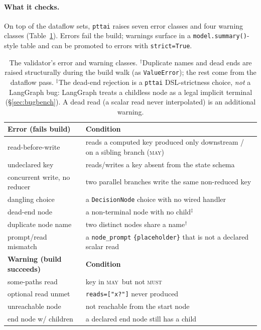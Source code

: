 \documentclass[11pt]{article}
\newcommand{\may}{\textsc{may}}
\newcommand{\must}{\textsc{must}}
\newcommand{\code}[1]{\texttt{#1}}
\begin{document}
\paragraph{What it checks.} On top of the dataflow sets, \code{pttai} raises
seven error classes and four warning classes (Table~\ref{tab:checks}). Errors
fail the build; warnings surface in a \code{model.summary()}-style table and can
be promoted to errors with \code{strict=True}.

\begin{table}[t]
  \centering
  \small
  \begin{tabular}{@{}p{}p{}@{}}
    \toprule
    \textbf{Error (fails build)} & \textbf{Condition} \\
    \midrule
    read-before-write & reads a computed key produced only downstream / on a
    sibling branch (\may) \\
    undeclared key & reads/writes a key absent from the state schema \\
    concurrent write, no reducer & two parallel branches write the same
    non-reduced key \\
    dangling choice & a \code{DecisionNode} choice with no wired handler \\
    dead-end node & a non-terminal node with no child$^\ddagger$ \\
    duplicate node name & two distinct nodes share a name$^\dagger$ \\
    prompt/read mismatch & a \code{node\_prompt} \code{\{placeholder\}} that is
    not a declared scalar read \\
    \midrule
    \textbf{Warning (build succeeds)} & \textbf{Condition} \\
    \midrule
    some-paths read & key in \may\ but not \must \\
    optional read unmet & \code{reads=["x?"]} never produced \\
    unreachable node & not reachable from the start node \\
    end node w/ children & a declared end node still has a child \\
    \bottomrule
  \end{tabular}
  \caption{The validator's error and warning classes. $^\dagger$Duplicate names
  and dead ends are raised structurally during the build walk (as
  \code{ValueError}); the rest come from the dataflow pass. $^\ddagger$The
  dead-end rejection is a \code{pttai} DSL-strictness choice, \emph{not} a
  LangGraph bug: LangGraph treats a childless node as a legal implicit terminal
  (\S\ref{sec:bugbench}). A dead read (a scalar read never interpolated) is an
  additional warning.}
  \label{tab:checks}
\end{table}
\end{document}
